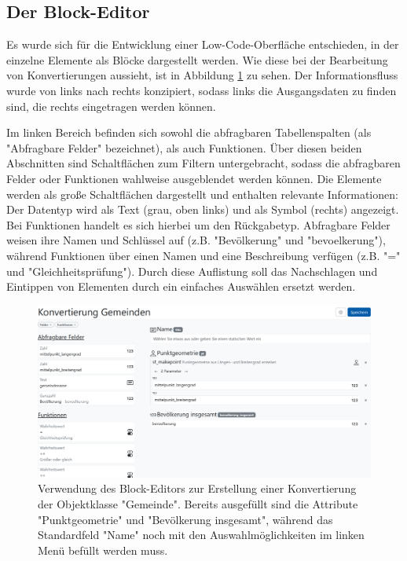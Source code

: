 \subsection{Der Block-Editor}

Es wurde sich für die Entwicklung einer Low-Code-Oberfläche entschieden, in der einzelne Elemente als Blöcke dargestellt werden. Wie diese bei der Bearbeitung von Konvertierungen aussieht, ist in Abbildung \ref{fig:buffet-simple} zu sehen. Der Informationsfluss wurde von links nach rechts konzipiert, sodass links die Ausgangsdaten zu finden sind, die rechts eingetragen werden können.

Im linken Bereich befinden sich sowohl die abfragbaren Tabellenspalten (als "Abfragbare Felder" bezeichnet), als auch Funktionen. Über diesen beiden Abschnitten sind Schaltflächen zum Filtern untergebracht, sodass die abfragbaren Felder oder Funktionen wahlweise ausgeblendet werden können. Die Elemente werden als große Schaltflächen dargestellt und enthalten relevante Informationen: Der Datentyp wird als Text (grau, oben links) und als Symbol (rechts) angezeigt. Bei Funktionen handelt es sich hierbei um den Rückgabetyp. Abfragbare Felder weisen ihre Namen und Schlüssel auf (z.B. "Bevölkerung" und "bevoelkerung"), während Funktionen über einen Namen und eine Beschreibung verfügen (z.B. "=" und "Gleichheitsprüfung"). Durch diese Auflistung soll das Nachschlagen und Eintippen von Elementen durch ein einfaches Auswählen ersetzt werden.

\begin{figure}[ht]
  \centering
  \includegraphics[width=.95\textwidth]{assets/buffet-simple.png}
  \caption{Verwendung des Block-Editors zur Erstellung einer Konvertierung der Objektklasse "Gemeinde". Bereits ausgefüllt sind die Attribute "Punktgeometrie" und "Bevölkerung insgesamt", während das Standardfeld "Name" noch mit den Auswahlmöglichkeiten im linken Menü befüllt werden muss.}
  \label{fig:buffet-simple}
\end{figure}

